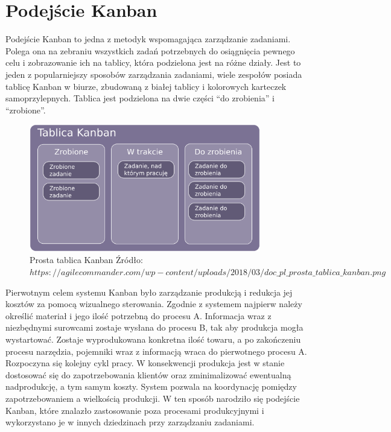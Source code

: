 \section{Podejście Kanban}

\indent 
Podejście Kanban to jedna z metodyk wspomagająca zarządzanie zadaniami. Polega ona na zebraniu wszystkich zadań potrzebnych do osiągnięcia pewnego celu i zobrazowanie ich na tablicy, która podzielona jest na różne działy. Jest to jeden z popularniejszy sposobów zarządzania zadaniami, wiele zespołów posiada tablicę Kanban w biurze, zbudowaną z białej tablicy i kolorowych karteczek samoprzylepnych. Tablica jest podzielona na dwie części “do zrobienia” i “zrobione”.
\begin{figure}[h]
	
	\centering
	\includegraphics[width=0.90\textwidth]{tablica_kanban}		
	 \caption{Prosta tablica Kanban \newline Źródło: $https://agilecommander.com/wp-content/uploads/2018/03/doc\_pl\_prosta\_tablica\_kanban.png $}
\end{figure}


Pierwotnym celem systemu Kanban było zarządzanie produkcją i redukcja jej kosztów za pomocą wizualnego sterowania. Zgodnie z systemem najpierw należy określić materiał i jego ilość potrzebną do procesu A. Informacja wraz z niezbędnymi surowcami zostaje wysłana do procesu B, tak aby produkcja mogła wystartować. Zostaje wyprodukowana konkretna ilość towaru, a po zakończeniu procesu narzędzia, pojemniki wraz z informacją  wraca do pierwotnego procesu A. Rozpoczyna  się kolejny cykl pracy. W konsekwencji produkcja jest w stanie dostosować się do zapotrzebowania klientów oraz zminimalizować ewentualną nadprodukcję, a tym samym koszty. System pozwala na koordynację pomiędzy zapotrzebowaniem a wielkością produkcji. W ten sposób narodziło się podejście Kanban, które znalazło zastosowanie poza procesami produkcyjnymi i wykorzystano je w innych dziedzinach przy zarządzaniu zadaniami.

